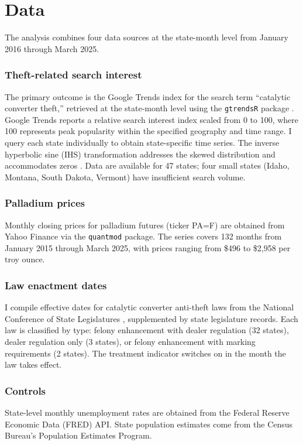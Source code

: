 \documentclass[12pt]{article}
\begin{document}
\section{Data}

The analysis combines four data sources at the state-month level from January 2016 through March 2025.

\subsubsection*{Theft-related search interest} The primary outcome is the Google Trends index for the search term ``catalytic converter theft,'' retrieved at the state-month level using the \texttt{gtrendsR} package \citep{massicotte2021gtrendsr}. Google Trends reports a relative search interest index scaled from 0 to 100, where 100 represents peak popularity within the specified geography and time range. I query each state individually to obtain state-specific time series. The inverse hyperbolic sine (IHS) transformation addresses the skewed distribution and accommodates zeros \citep{bellemare2020elasticities}. Data are available for 47 states; four small states (Idaho, Montana, South Dakota, Vermont) have insufficient search volume.

\subsubsection*{Palladium prices} Monthly closing prices for palladium futures (ticker PA=F) are obtained from Yahoo Finance via the \texttt{quantmod} package. The series covers 132 months from January 2015 through March 2025, with prices ranging from \$496 to \$2,958 per troy ounce.

\subsubsection*{Law enactment dates} I compile effective dates for catalytic converter anti-theft laws from the National Conference of State Legislatures \citep{ncsl2024catconv}, supplemented by state legislature records. Each law is classified by type: felony enhancement with dealer regulation (32 states), dealer regulation only (3 states), or felony enhancement with marking requirements (2 states). The treatment indicator switches on in the month the law takes effect.

\subsubsection*{Controls} State-level monthly unemployment rates are obtained from the Federal Reserve Economic Data (FRED) API. State population estimates come from the Census Bureau's Population Estimates Program.
\end{document}
